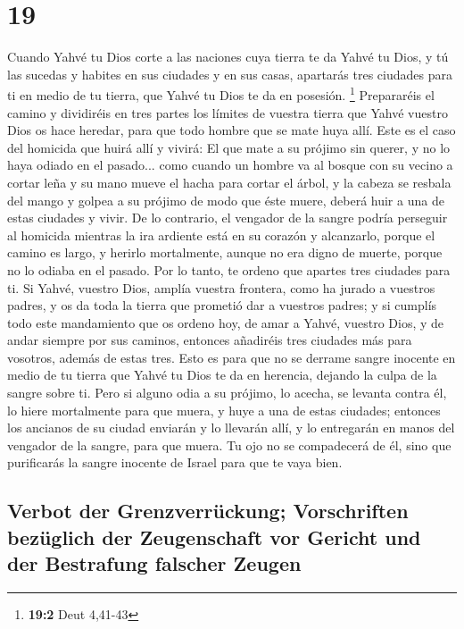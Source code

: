 \hypertarget{section-18}{%
\section{19}\label{section-18}}

 Cuando Yahvé tu Dios corte a las naciones cuya tierra te
da Yahvé tu Dios, y tú las sucedas y habites en sus ciudades y en sus
casas,  apartarás tres ciudades para ti en medio de tu
tierra, que Yahvé tu Dios te da en posesión. \footnote{\textbf{19:2}
  Deut 4,41-43}  Prepararéis el camino y dividiréis en
tres partes los límites de vuestra tierra que Yahvé vuestro Dios os hace
heredar, para que todo hombre que se mate huya allí.  Este
es el caso del homicida que huirá allí y vivirá: El que mate a su
prójimo sin querer, y no lo haya odiado en el pasado... 
como cuando un hombre va al bosque con su vecino a cortar leña y su mano
mueve el hacha para cortar el árbol, y la cabeza se resbala del mango y
golpea a su prójimo de modo que éste muere, deberá huir a una de estas
ciudades y vivir.  De lo contrario, el vengador de la
sangre podría perseguir al homicida mientras la ira ardiente está en su
corazón y alcanzarlo, porque el camino es largo, y herirlo mortalmente,
aunque no era digno de muerte, porque no lo odiaba en el pasado.
 Por lo tanto, te ordeno que apartes tres ciudades para
ti.  Si Yahvé, vuestro Dios, amplía vuestra frontera, como
ha jurado a vuestros padres, y os da toda la tierra que prometió dar a
vuestros padres;  y si cumplís todo este mandamiento que
os ordeno hoy, de amar a Yahvé, vuestro Dios, y de andar siempre por sus
caminos, entonces añadiréis tres ciudades más para vosotros, además de
estas tres.  Esto es para que no se derrame sangre
inocente en medio de tu tierra que Yahvé tu Dios te da en herencia,
dejando la culpa de la sangre sobre ti.  Pero si alguno
odia a su prójimo, lo acecha, se levanta contra él, lo hiere mortalmente
para que muera, y huye a una de estas ciudades;  entonces
los ancianos de su ciudad enviarán y lo llevarán allí, y lo entregarán
en manos del vengador de la sangre, para que muera.  Tu
ojo no se compadecerá de él, sino que purificarás la sangre inocente de
Israel para que te vaya bien.

\hypertarget{verbot-der-grenzverruxfcckung-vorschriften-bezuxfcglich-der-zeugenschaft-vor-gericht-und-der-bestrafung-falscher-zeugen}{%
\subsection{Verbot der Grenzverrückung; Vorschriften bezüglich der
Zeugenschaft vor Gericht und der Bestrafung falscher
Zeugen}\label{verbot-der-grenzverruxfcckung-vorschriften-bezuxfcglich-der-zeugenschaft-vor-gericht-und-der-bestrafung-falscher-zeugen}}

